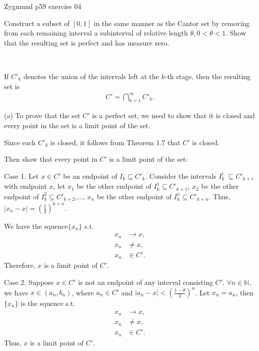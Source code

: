 \documentclass[UTF8,a4paper,10pt]{article}
\begin{document}
  \pagebreak


  \begin{Problem}[]{Zygmund p59 exercise 04}

    Construct a subset of $[0, 1]$ in the same manner as the Cantor set by
    removing from each remaining interval a subinterval of relative length
    $\theta, 0 < \theta < 1$. Show that the resulting set is perfect and has measure zero.
  
  \end{Problem}

  \begin{solution}\,

  If \(C'_k\) denotes the union of the intervals left at the
$k$-th stage, then the resulting set is
\begin{equation*}
  \begin{aligned}
    C' =  \bigcap_{k=1}^{\infty} C'_k  .
  \end{aligned}
\end{equation*}


  (a) To prove that the set \(C'\) is a perfect set, we need to show that it is closed and every point in the set is a limit point of the set.

  Since each \(C'_k\) is closed, it follows from Theorem 1.7 that \(C'\) is closed. 

  Then show that every point in \(C'\) is a limit point of the set:

  Case 1. Let \(x\in C'\) be an endpoint of \(I_k\subseteq C'_k\). Consider the intervals \(I_k^i\ \subseteq C'_{k+i}\) with endpoint \(x\), let \(x_1\) be the other endpoint of \(I_k^1\subseteq C'_{k+1}\), \(x_2\) be the other endpoint of \(I_k^2\subseteq C'_{k+2}\),..., \(x_n\) be the other endpoint of \(I_k^n
  \subseteq C'_{k+n}\).
  Thus, \(|x_n-x|=(\frac{1}{3})^{k+n}\).

  We have the squence\(\{x_n\}\) s.t. 
  \begin{equation*}
    \begin{aligned}
      x_n&\to x,\\
      x_n&\neq x,\\
      x_n&\in C'.
    \end{aligned}
  \end{equation*}
  Therefore, \(x\) is a limit point of \(C'\).

  Case 2. Suppose \(x\in C'\) is not an endpoint of any interval consisting \(C'\). \(\forall n\in\mathbb{N}\), we have \(x\in (a_n, b_n)\), where \(a_n\in C'\) and \(|a_n-x|<(\frac{1-\theta}{2})^{n}\). Let \(x_n = a_n\), then \(\{x_n\}\) is the squence s.t. 
  \begin{equation*}
    \begin{aligned}
      x_n&\to x,\\
      x_n&\neq x,\\
      x_n&\in C'.
    \end{aligned}
  \end{equation*}
  Thus, \(x\) is a limit point of \(C'\).


\end{solution}
\end{document}
